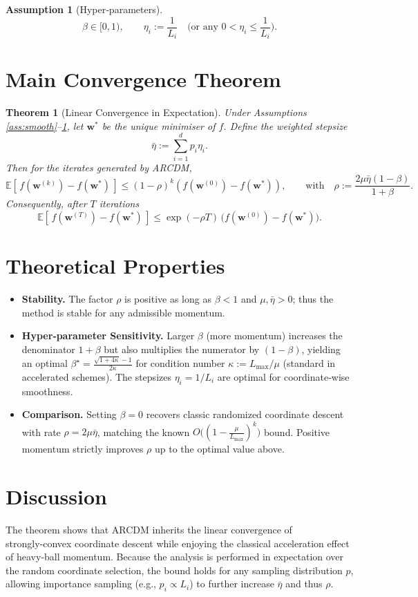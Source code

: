 \documentclass{article}
\newtheorem{theorem}{Theorem}
\newtheorem{assumption}{Assumption}
\newcommand{\E}{\mathbb{E}}
\begin{document}
\begin{assumption}[Hyper‑parameters]\label{ass:params}
\[
\beta\in[0,1),\qquad 
\eta_i:=\frac{1}{L_i}\quad\text{(or any }0<\eta_i\le\frac{1}{L_i}\text{)}.
\]
\end{assumption}

\section*{Main Convergence Theorem}
\begin{theorem}[Linear Convergence in Expectation]\label{thm:linear}
Under Assumptions \ref{ass:smooth}–\ref{ass:params}, let $\mathbf w^{*}$ be the unique minimiser of $f$. Define the weighted stepsize
\[
\bar\eta:=\sum_{i=1}^{d}p_i\eta_i .
\]
Then for the iterates generated by ARCDM,
\[
\E\!\left[\,f(\mathbf w^{(k)})-f(\mathbf w^{*})\,\right]
\le\left(1-\rho\right)^{k}\!\left(f(\mathbf w^{(0)})-f(\mathbf w^{*})\right),
\qquad\text{with}\quad
\rho:=\frac{2\mu\bar\eta(1-\beta)}{1+\beta}.
\]
Consequently, after $T$ iterations
\[
\E\!\left[\,f(\mathbf w^{(T)})-f(\mathbf w^{*})\,\right]
\le \exp(-\rho T)\,\bigl(f(\mathbf w^{(0)})-f(\mathbf w^{*})\bigr).
\]
\end{theorem}

\section*{Theoretical Properties}
\begin{itemize}
    \item \textbf{Stability.} The factor $\rho$ is positive as long as $\beta<1$ and $\mu,\bar\eta>0$; thus the method is stable for any admissible momentum.
    \item \textbf{Hyper‑parameter Sensitivity.} Larger $\beta$ (more momentum) increases the denominator $1+\beta$ but also multiplies the numerator by $(1-\beta)$, yielding an optimal $\beta^{\star}= \frac{\sqrt{1+4\kappa}-1}{2\kappa}$ for condition number $\kappa:=L_{\max}/\mu$ (standard in accelerated schemes). The stepsizes $\eta_i=1/L_i$ are optimal for coordinate‑wise smoothness.
    \item \textbf{Comparison.} Setting $\beta=0$ recovers classic randomized coordinate descent with rate $\rho=2\mu\bar\eta$, matching the known $O\bigl((1-\frac{\mu}{L_{\max}})^{k}\bigr)$ bound. Positive momentum strictly improves $\rho$ up to the optimal value above.
\end{itemize}

\section*{Discussion}
The theorem shows that ARCDM inherits the linear convergence of strongly‑convex coordinate descent while enjoying the classical acceleration effect of heavy‑ball momentum. Because the analysis is performed in expectation over the random coordinate selection, the bound holds for any sampling distribution $p$, allowing importance sampling (e.g., $p_i\propto L_i$) to further increase $\bar\eta$ and thus $\rho$.
\end{document}
